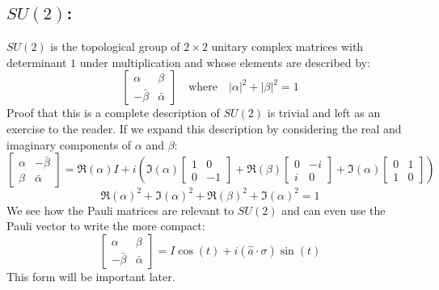 \begin{center}
\end{center}

\subsection{$SU(2)$:}
$SU(2)$ is the topological group of $2\times2$ unitary complex matrices with determinant $1$ under multiplication and whose elements are described by:
\[\begin{bmatrix} \alpha& \beta\\-\bar{\beta}&\bar{\alpha}\end{bmatrix}\quad\text{where}\quad|\alpha|^2+|\beta|^2=1\]
Proof that this is a complete description of $SU(2)$ is trivial and left as an exercise to the reader.
If we expand this description by considering the real and imaginary components of $\alpha$ and $\beta$:
\[
	\begin{bmatrix} \alpha& -\bar{\beta}\\\beta&\bar{\alpha}\end{bmatrix} = 
	\Re(\alpha)I+i\left(
	\Im(\alpha)\begin{bmatrix} 1&0\\0&-1\end{bmatrix}
	+\Re(\beta)\begin{bmatrix}0&-i\\ i&0\end{bmatrix}
	+\Im(\alpha)\begin{bmatrix} 0&1\\1&0\end{bmatrix}
	\right)
\]
\[\Re(\alpha)^2+\Im(\alpha)^2+\Re(\beta)^2+\Im(\alpha)^2=1\]
We see how the Pauli matrices are relevant to $SU(2)$ and can even use the Pauli vector to write the more compact:
\[\begin{bmatrix} \alpha& \beta\\-\bar{\beta}&\bar{\alpha}\end{bmatrix}=I\cos(t)+i(\hat{a}\cdot\sigma)\sin(t)\]
This form will be important later.


